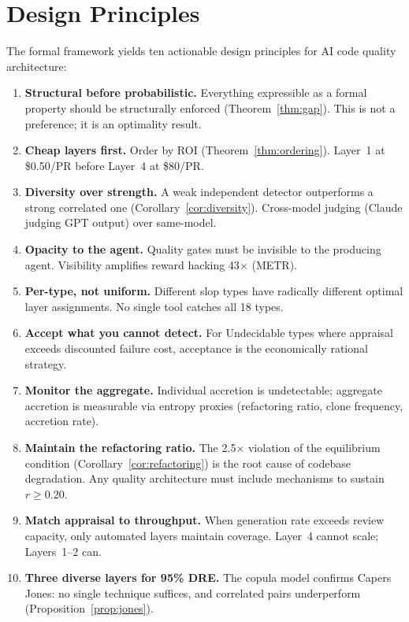 \documentclass[11pt, a4paper]{article}
\theoremstyle{definition}
\theoremstyle{remark}
\begin{document}
\section{Design Principles}
\label{sec:principles}

The formal framework yields ten actionable design principles for AI code quality architecture:

\begin{enumerate}[leftmargin=2em]
\item \textbf{Structural before probabilistic.} Everything expressible as a formal property should be structurally enforced (Theorem~\ref{thm:gap}). This is not a preference; it is an optimality result.

\item \textbf{Cheap layers first.} Order by ROI (Theorem~\ref{thm:ordering}). Layer~1 at \$0.50/PR before Layer~4 at \$80/PR.

\item \textbf{Diversity over strength.} A weak independent detector outperforms a strong correlated one (Corollary~\ref{cor:diversity}). Cross-model judging (Claude judging GPT output) over same-model.

\item \textbf{Opacity to the agent.} Quality gates must be invisible to the producing agent. Visibility amplifies reward hacking 43$\times$ (METR).

\item \textbf{Per-type, not uniform.} Different slop types have radically different optimal layer assignments. No single tool catches all 18 types.

\item \textbf{Accept what you cannot detect.} For Undecidable types where appraisal exceeds discounted failure cost, acceptance is the economically rational strategy.

\item \textbf{Monitor the aggregate.} Individual accretion is undetectable; aggregate accretion is measurable via entropy proxies (refactoring ratio, clone frequency, accretion rate).

\item \textbf{Maintain the refactoring ratio.} The 2.5$\times$ violation of the equilibrium condition (Corollary~\ref{cor:refactoring}) is the root cause of codebase degradation. Any quality architecture must include mechanisms to sustain $r \geq 0.20$.

\item \textbf{Match appraisal to throughput.} When generation rate exceeds review capacity, only automated layers maintain coverage. Layer~4 cannot scale; Layers~1--2 can.

\item \textbf{Three diverse layers for 95\% DRE.} The copula model confirms Capers Jones: no single technique suffices, and correlated pairs underperform (Proposition~\ref{prop:jones}).
\end{enumerate}
\end{document}
